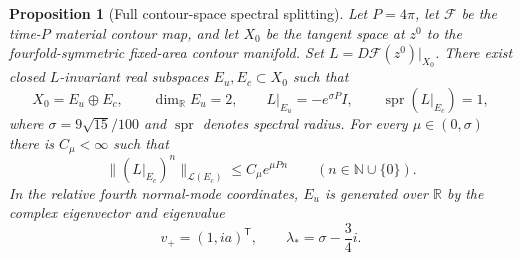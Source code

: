 \documentclass[11pt]{amsart}
\newtheorem{proposition}[theorem]{Proposition}
\theoremstyle{remark}
\numberwithin{equation}{section}
\newcommand{\R}{\mathbb R}
\begin{document}
\begin{proposition}[Full contour-space spectral splitting]
\label{pc:spectrum}
Let $P=4\pi$, let $\mathcal F$ be the time-$P$ material contour map,
and let $X_0$ be the tangent space at $z^0$ to the fourfold-symmetric
fixed-area contour manifold. Set $L=D\mathcal F(z^0)|_{X_0}$.
There exist closed $L$-invariant real subspaces $E_u,E_c\subset X_0$
such that
\[
 X_0=E_u\oplus E_c,\qquad \dim_\R E_u=2,\qquad
 L|_{E_u}=-e^{\sigma P}I,\qquad
 \operatorname{spr}(L|_{E_c})=1,
\]
where $\sigma=9\sqrt{15}/100$ and $\operatorname{spr}$ denotes
spectral radius. For every $\mu\in(0,\sigma)$ there is $C_\mu<\infty$
such that
\[
 \|(L|_{E_c})^n\|_{\mathcal L(E_c)}\le C_\mu e^{\mu Pn}
 \qquad(n\in\mathbb N\cup\{0\}).
\]
In the relative fourth normal-mode coordinates, $E_u$ is generated
over $\R$ by the complex eigenvector and eigenvalue
\[
 v_+=(1,ia)^{\mathsf T},\qquad
 \lambda_*=\sigma-\frac34i.
\]
\end{proposition}
\end{document}
